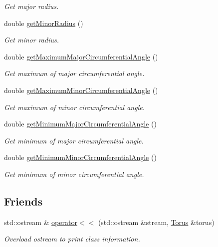 \begin{DoxyCompactItemize}
\begin{DoxyCompactList}\small\item\em Get major radius. \end{DoxyCompactList}\item 
double \hyperlink{classtudat_1_1geometric__shapes_1_1Torus_a08122ea7df1c1c4abe180cc39def306f}{get\+Minor\+Radius} ()
\begin{DoxyCompactList}\small\item\em Get minor radius. \end{DoxyCompactList}\item 
double \hyperlink{classtudat_1_1geometric__shapes_1_1Torus_a3bcf4367a55dceb257e7b9a24939e8db}{get\+Maximum\+Major\+Circumferential\+Angle} ()
\begin{DoxyCompactList}\small\item\em Get maximum of major circumferential angle. \end{DoxyCompactList}\item 
double \hyperlink{classtudat_1_1geometric__shapes_1_1Torus_acd0484e5469ba29399f72a13590fbbf2}{get\+Maximum\+Minor\+Circumferential\+Angle} ()
\begin{DoxyCompactList}\small\item\em Get maximum of minor circumferential angle. \end{DoxyCompactList}\item 
double \hyperlink{classtudat_1_1geometric__shapes_1_1Torus_a84a6e6987f489f56641050251fac6b01}{get\+Minimum\+Major\+Circumferential\+Angle} ()
\begin{DoxyCompactList}\small\item\em Get minimum of major circumferential angle. \end{DoxyCompactList}\item 
double \hyperlink{classtudat_1_1geometric__shapes_1_1Torus_a7776ba439c6a70a8eee37723709bcb6e}{get\+Minimum\+Minor\+Circumferential\+Angle} ()
\begin{DoxyCompactList}\small\item\em Get minimum of minor circumferential angle. \end{DoxyCompactList}\end{DoxyCompactItemize}
\subsection*{Friends}
\begin{DoxyCompactItemize}
\item 
std\+::ostream \& \hyperlink{classtudat_1_1geometric__shapes_1_1Torus_a984a8ce4547e36f6d9a1ce07df87e2d8}{operator$<$$<$} (std\+::ostream \&stream, \hyperlink{classtudat_1_1geometric__shapes_1_1Torus}{Torus} \&torus)
\begin{DoxyCompactList}\small\item\em Overload ostream to print class information. \end{DoxyCompactList}\end{DoxyCompactItemize}

